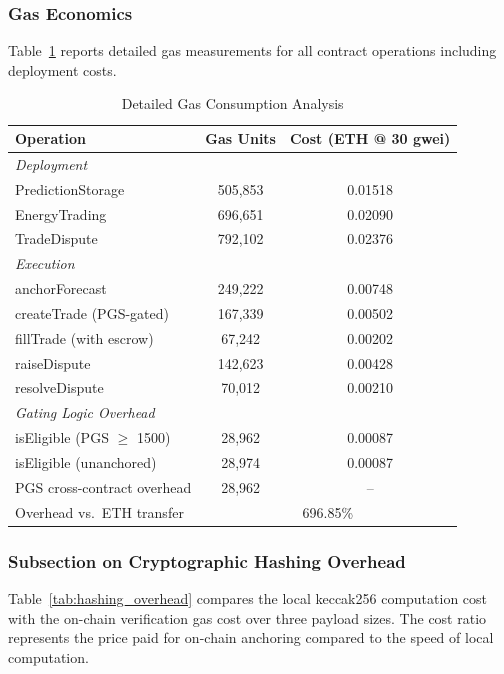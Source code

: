 \documentclass{ieeeaccess}
\begin{document}
\subsubsection{Gas Economics}
Table~\ref{tab:gas_detailed} reports detailed gas measurements for all contract operations including deployment costs.

\begin{table}[!t]
\caption{Detailed Gas Consumption Analysis}
\label{tab:gas_detailed}
\centering
\begin{tabular}{lcc}
\toprule
\textbf{Operation} & \textbf{Gas Units} & \textbf{Cost (ETH @ 30 gwei)} \\
\midrule
\multicolumn{3}{l}{\emph{Deployment}} \\
PredictionStorage & 505,853 & 0.01518 \\
EnergyTrading & 696,651 & 0.02090 \\
TradeDispute & 792,102 & 0.02376 \\
\midrule
\multicolumn{3}{l}{\emph{Execution}} \\
anchorForecast & 249,222 & 0.00748 \\
createTrade (PGS-gated) & 167,339 & 0.00502 \\
fillTrade (with escrow) & 67,242 & 0.00202 \\
raiseDispute & 142,623 & 0.00428 \\
resolveDispute & 70,012 & 0.00210 \\
\midrule
\multicolumn{3}{l}{\emph{Gating Logic Overhead}} \\
isEligible (PGS $\ge$ 1500) & 28,962 & 0.00087 \\
isEligible (unanchored) & 28,974 & 0.00087 \\
PGS cross-contract overhead & 28,962 & -- \\
Overhead vs.\ ETH transfer & \multicolumn{2}{c}{696.85\%} \\
\bottomrule
\end{tabular}
\end{table}
\subsubsection{Subsection on Cryptographic Hashing Overhead}

Table~\ref{tab:hashing_overhead} compares the local keccak256 computation cost with the on-chain verification gas cost over three payload sizes. The cost ratio represents the price paid for on-chain anchoring compared to the speed of local computation.
\end{document}
